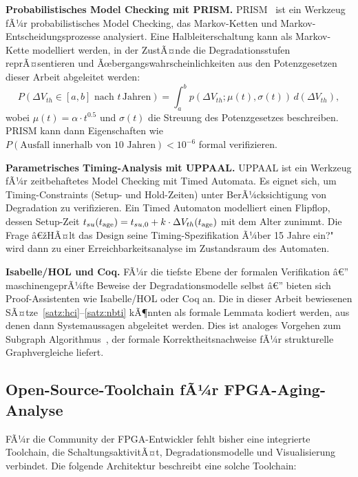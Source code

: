 ﻿\documentclass[a4paper,12pt]{article}
\theoremstyle{definition}
\begin{document}
\textbf{Probabilistisches Model Checking mit PRISM.}
PRISM~\cite{kwiatkowska2011} ist ein Werkzeug fÃ¼r probabilistisches Model Checking,
das Markov-Ketten und Markov-Entscheidungsprozesse analysiert. Eine
Halbleiterschaltung kann als Markov-Kette modelliert werden, in der ZustÃ¤nde
die Degradationsstufen reprÃ¤sentieren und Ãœbergangswahrscheinlichkeiten aus
den Potenzgesetzen dieser Arbeit abgeleitet werden:
\[
P(\Delta V_{th} \in [a, b] \text{ nach } t\,\text{Jahren}) =
\int_a^b p(\Delta V_{th}; \mu(t), \sigma(t))\, d(\Delta V_{th}),
\]
wobei $\mu(t) = \alpha \cdot t^{0.5}$ und $\sigma(t)$ die Streuung des
Potenzgesetzes beschreiben. PRISM kann dann Eigenschaften wie
$P(\text{Ausfall innerhalb von 10 Jahren}) < 10^{-6}$ formal verifizieren.

\textbf{Parametrisches Timing-Analysis mit UPPAAL.}
UPPAAL ist ein Werkzeug fÃ¼r zeitbehaftetes Model Checking mit Timed Automata.
Es eignet sich, um Timing-Constraints (Setup- und Hold-Zeiten) unter BerÃ¼cksichtigung
von Degradation zu verifizieren. Ein Timed Automaton modelliert einen Flipflop,
dessen Setup-Zeit $t_{su}(t_{\rm age}) = t_{su,0} + k \cdot \Delta V_{th}(t_{\rm age})$
mit dem Alter zunimmt. Die Frage â€žHÃ¤lt das Design seine Timing-Spezifikation Ã¼ber
15 Jahre ein?" wird dann zu einer Erreichbarkeitsanalyse im Zustandsraum des Automaten.

\textbf{Isabelle/HOL und Coq.}
FÃ¼r die tiefste Ebene der formalen Verifikation â€” maschinengeprÃ¼fte Beweise der
Degradationsmodelle selbst â€” bieten sich Proof-Assistenten wie Isabelle/HOL
oder Coq an. Die in dieser Arbeit bewiesenen SÃ¤tze~\ref{satz:hci}--\ref{satz:nbti}
kÃ¶nnten als formale Lemmata kodiert werden, aus denen dann Systemaussagen
abgeleitet werden. Dies ist analoges Vorgehen zum Subgraph Algorithmus~\cite{epp2026},
der formale Korrektheitsnachweise fÃ¼r strukturelle Graphvergleiche liefert.

\subsection{Open-Source-Toolchain fÃ¼r FPGA-Aging-Analyse}
\label{sub:toolchain}

FÃ¼r die Community der FPGA-Entwickler fehlt bisher eine integrierte Toolchain,
die SchaltungsaktivitÃ¤t, Degradationsmodelle und Visualisierung verbindet.
Die folgende Architektur beschreibt eine solche Toolchain:
\end{document}
